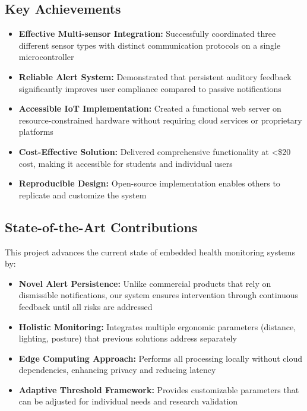 \documentclass[12pt,a4paper]{article}
\begin{document}
\subsection{Key Achievements}

\begin{itemize}
\item \textbf{Effective Multi-sensor Integration:} Successfully coordinated three different sensor types with distinct communication protocols on a single microcontroller

\item \textbf{Reliable Alert System:} Demonstrated that persistent auditory feedback significantly improves user compliance compared to passive notifications

\item \textbf{Accessible IoT Implementation:} Created a functional web server on resource-constrained hardware without requiring cloud services or proprietary platforms

\item \textbf{Cost-Effective Solution:} Delivered comprehensive functionality at <\$20 cost, making it accessible for students and individual users

\item \textbf{Reproducible Design:} Open-source implementation enables others to replicate and customize the system
\end{itemize}

\subsection{State-of-the-Art Contributions}

This project advances the current state of embedded health monitoring systems by:

\begin{itemize}
\item \textbf{Novel Alert Persistence:} Unlike commercial products that rely on dismissible notifications, our system ensures intervention through continuous feedback until all risks are addressed

\item \textbf{Holistic Monitoring:} Integrates multiple ergonomic parameters (distance, lighting, posture) that previous solutions address separately

\item \textbf{Edge Computing Approach:} Performs all processing locally without cloud dependencies, enhancing privacy and reducing latency

\item \textbf{Adaptive Threshold Framework:} Provides customizable parameters that can be adjusted for individual needs and research validation
\end{itemize}
\end{document}
